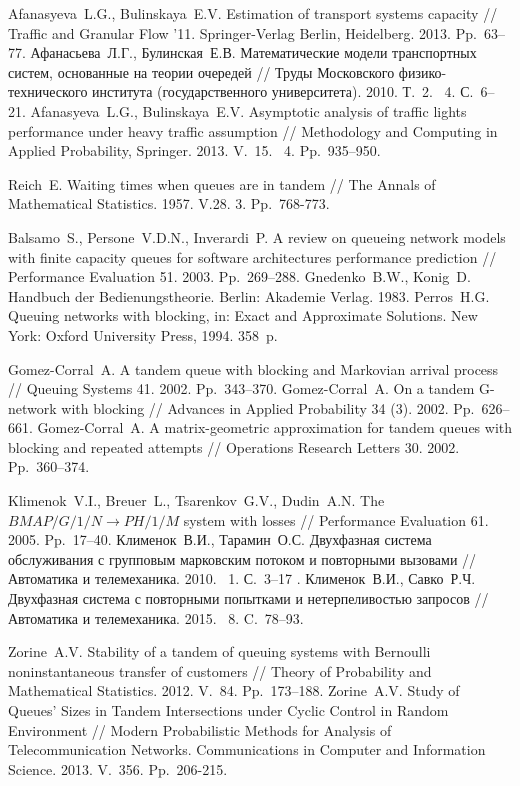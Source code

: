 \documentclass[12pt]{extarticle}
\theoremstyle{theorem}
\theoremstyle{remark}
\newcommand{\No}{\textnumero}
\begin{document}
\begin{thebibliography}{99}
 Afanasyeva~L.G., Bulinskaya~E.V. Estimation of transport systems capacity // Traffic and Granular Flow '11. Springer-Verlag Berlin, Heidelberg. 2013. Pp.~63--77.
 Афанасьева~Л.Г., Булинская~Е.В. Математические модели транспортных систем, основанные на теории очередей // Труды Московского физико-технического института (государственного университета). 2010. Т.~2. \No{}~4. С.~6–21.
 Afanasyeva~L.G., Bulinskaya~E.V. Asymptotic analysis of traffic lights performance under heavy traffic assumption // Methodology and Computing in Applied Probability, Springer. 2013. V.~15. \No{}~4. Pp.~935--950.

 Reich~E.  Waiting times when queues are in tandem // The Annals of Mathematical Statistics. 1957. V.28. \No{}3. Pp.~768-773.

 Balsamo~S., Persone~V.D.N., Inverardi~P. A review on queueing network models with finite capacity queues for software architectures performance prediction // Performance Evaluation 51. 2003. Pp.~269–288.
 Gnedenko~B.W., Konig~D. Handbuch der Bedienungstheorie. Berlin: Akademie Verlag. 1983. 
 Perros~H.G.  Queuing networks with blocking, in: Exact and Approximate Solutions. New York: Oxford University Press, 1994. 358~p.


 Gomez-Corral~A. A tandem queue with blocking and Markovian arrival process // Queuing Systems 41. 2002. Pp.~343--370.
 Gomez-Corral~A. On a tandem G-network with blocking // Advances in Applied Probability 34 (3). 2002. Pp.~626--661.
 Gomez-Corral~A. A matrix-geometric approximation for tandem queues with blocking and repeated attempts // Operations Research Letters  30. 2002. Pp.~360--374.

 Klimenok~V.I., Breuer~L., Tsarenkov~G.V., Dudin~A.N. The $BMAP/G/1/N \to PH/1/M$ system with losses // Performance Evaluation 61. 2005. Pp.~17--40.
 Клименок~В.И., Тарамин~О.С. Двухфазная система обслуживания с групповым марковским потоком и повторными вызовами // Автоматика и телемеханика. 2010. \No~1. С.~3--17 .
 Клименок~В.И., Савко~Р.Ч. Двухфазная система с повторными попытками и нетерпеливостью запросов // Автоматика и телемеханика. 2015. \No{}~8. C.~78--93. 

 Zorine~A.V. Stability of a tandem of queuing systems with Bernoulli noninstantaneous transfer of customers // Theory of Probability and Mathematical Statistics. 2012. V.~84. Pp.~173--188.
 Zorine~A.V. Study of Queues' Sizes in Tandem Intersections under Cyclic Control in Random Environment // Modern Probabilistic Methods for Analysis of Telecommunication Networks. Communications in Computer and Information Science. 2013. V.~356. Pp.~206-215.


\end{thebibliography}
\end{document}

